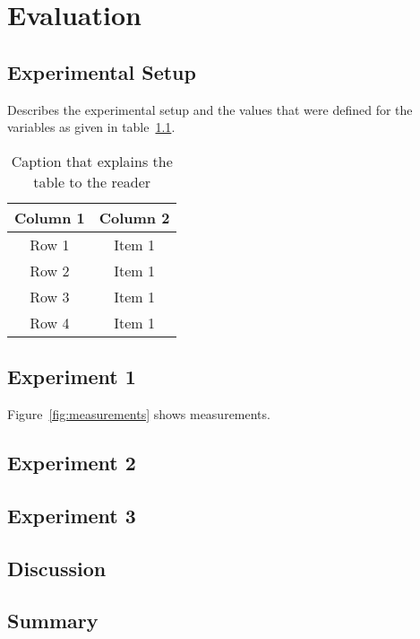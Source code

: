 \chapter{Evaluation}


\section{Experimental Setup}

Describes the experimental setup and the values that were defined for the variables as given in table~\ref{table:experimentsetup}.

\begin{table}[!h]
\begin{center}
	\begin{tabular}{|c|c|} 
	\hline
 	\bf Column 1  & \bf Column 2   \\
  	\hline
	Row 1 & Item 1  \\
	Row 2 & Item 1  \\
	Row 3 & Item 1  \\
	Row 4 & Item 1  \\
	\hline
	\end{tabular}
\end{center}
\caption[Variables of the experiment]{Caption that explains the table to the reader}	
\label{table:experimentsetup}
\end{table}


\section{Experiment 1}

Figure~\ref{fig:measurements} shows measurements.


\section{Experiment 2}

\section{Experiment 3}

\section{Discussion}

\section{Summary}